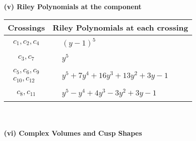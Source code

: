\documentclass[1p]{elsarticle_modified}
\theoremstyle{definition}
\begin{document}
\newpage\renewcommand{\arraystretch}{1}
\flushleft \textbf{(v) Riley Polynomials at the component}\newline \\
\begin{tabular}{m{50pt}|m{274pt}}
Crossings & \hspace{64pt}Riley Polynomials at each crossing \\
\hline $$\begin{aligned}c_{1},c_{2},c_{4}\end{aligned}$$&$\begin{aligned}
&(y-1)^5
\end{aligned}$\\
\hline $$\begin{aligned}c_{3},c_{7}\end{aligned}$$&$\begin{aligned}
&y^5
\end{aligned}$\\
\hline $$\begin{aligned}c_{5},c_{6},c_{9}\\c_{10},c_{12}\end{aligned}$$&$\begin{aligned}
&y^5+7 y^4+16 y^3+13 y^2+3 y-1
\end{aligned}$\\
\hline $$\begin{aligned}c_{8},c_{11}\end{aligned}$$&$\begin{aligned}
&y^5- y^4+4 y^3-3 y^2+3 y-1
\end{aligned}$\\
\hline
\end{tabular}\\~\\
\newpage\flushleft \textbf{(vi) Complex Volumes and Cusp Shapes}
\end{document}
